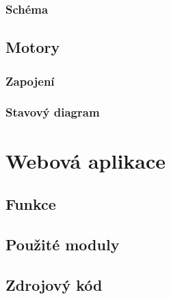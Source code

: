 \documentclass[FM,BP]{tulthesis}
\begin{document}
  \subsection {Schéma}
  \section {Motory}
  \subsection {Zapojení}
  \subsection {Stavový diagram}
\chapter {Webová aplikace}
\section {Funkce}
 \section {Použité moduly}
  \section {Zdrojový kód}
  
 
 
  
 


\end{document}
